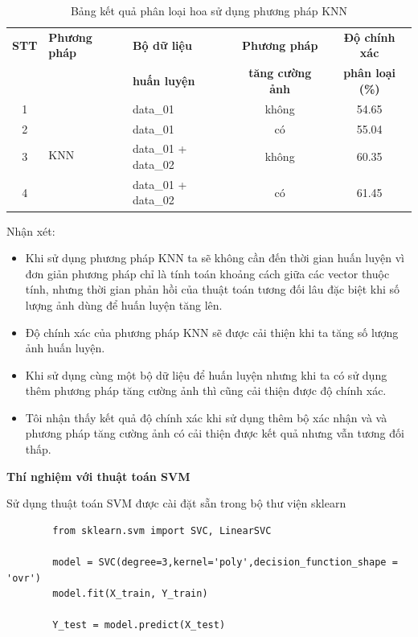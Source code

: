 \documentclass[12pt]{report}
\begin{document}
		\begin{table}[h]
			\centering
			\caption{Bảng kết quả phân loại hoa sử dụng phương pháp KNN}
			\label{tbl:table ket qua cua KNN}
			\begin{tabular}{|c|l|l|c|c|}
				\hline
				\textbf{STT} & \textbf{Phương pháp} & \textbf{Bộ dữ liệu} & \textbf{Phương pháp}       & \textbf{Độ chính xác} \\ 
				             &                         & \textbf{huấn luyện}   & \textbf{tăng cường ảnh} & \textbf{phân loại (\%)} \\ \hline
				1            & \multirow{4}{*}{KNN}    & data\_01                  & không                        & 54.65                      \\ \cline{1-1} \cline{3-5}
				2            &                         & data\_01                  & có                           & 55.04                      \\ \cline{1-1}\cline{3-5}
				3            &                         & data\_01 + data\_02       & không                        & 60.35                      \\ \cline{1-1}\cline{3-5}
				4            &                         & data\_01 + data\_02       & có                           & 61.45                      \\ \hline
			\end{tabular}
		\end{table}
		Nhận xét: 		
		\begin{itemize}
			\item Khi sử dụng phương pháp KNN ta sẽ không cần đến thời gian huấn luyện vì đơn giản phương pháp chỉ là tính toán khoảng cách giữa các vector thuộc tính, nhưng thời gian phản hồi của thuật toán tương đối lâu đặc biệt khi số lượng ảnh dùng để huấn luyện tăng lên.
			\item Độ chính xác của phương pháp KNN sẽ được cải thiện khi ta tăng số lượng ảnh huấn luyện.
			\item Khi sử dụng cùng một bộ dữ liệu để huấn luyện nhưng khi ta có sử dụng thêm phương pháp tăng cường ảnh thì cũng cải thiện được độ chính xác.
			\item Tôi nhận thấy kết quả độ chính xác khi sử dụng thêm bộ xác nhận và và phương pháp tăng cường ảnh có cải thiện được kết quả nhưng vẫn tương đối thấp.
		\end{itemize}
				
		\textbf{Thí nghiệm với thuật toán SVM}
						
		Sử dụng thuật toán SVM được cài đặt sẵn trong bộ thư viện sklearn
		\begin{lstlisting}
		from sklearn.svm import SVC, LinearSVC

		model = SVC(degree=3,kernel='poly',decision_function_shape = 'ovr')
		model.fit(X_train, Y_train)

		Y_test = model.predict(X_test)
		\end{lstlisting}
				
\end{document}
